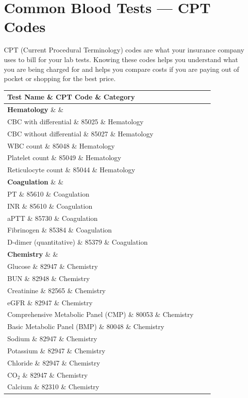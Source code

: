 \clearpage
\section{Common Blood Tests --- CPT Codes}

CPT (Current Procedural Terminology) codes are what your insurance company uses to bill for your lab tests. Knowing these codes helps you understand what you are being charged for and helps you compare costs if you are paying out of pocket or shopping for the best price.

\begin{longtable}{@{}lll@{}}
\toprule
\textbf{Test Name} \& \textbf{CPT Code} \& \textbf{Category} \\
\midrule
\endhead
\textbf{Hematology} \& \& \\
CBC with differential \& 85025 \& Hematology \\
CBC without differential \& 85027 \& Hematology \\
WBC count \& 85048 \& Hematology \\
Platelet count \& 85049 \& Hematology \\
Reticulocyte count \& 85044 \& Hematology \\
\textbf{Coagulation} \& \& \\
PT \& 85610 \& Coagulation \\
INR \& 85610 \& Coagulation \\
aPTT \& 85730 \& Coagulation \\
Fibrinogen \& 85384 \& Coagulation \\
D-dimer (quantitative) \& 85379 \& Coagulation \\
\textbf{Chemistry} \& \& \\
Glucose \& 82947 \& Chemistry \\
BUN \& 82948 \& Chemistry \\
Creatinine \& 82565 \& Chemistry \\
eGFR \& 82947 \& Chemistry \\
Comprehensive Metabolic Panel (CMP) \& 80053 \& Chemistry \\
Basic Metabolic Panel (BMP) \& 80048 \& Chemistry \\
Sodium \& 82947 \& Chemistry \\
Potassium \& 82947 \& Chemistry \\
Chloride \& 82947 \& Chemistry \\
CO$_2$ \& 82947 \& Chemistry \\
Calcium \& 82310 \& Chemistry \\

\end{longtable}
